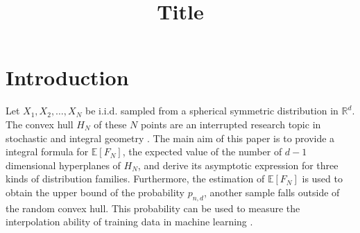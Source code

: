 \documentclass{aptpub}
\def\E{\mathbb{E}}
\begin{document}

\title{Title} %




\begin{abstract}
\end{abstract}

\keywords{}%

\ams{}{}%


\section{Introduction} %


Let $X_1, X_2, \dots, X_N$ be i.i.d. sampled from a spherical symmetric distribution in $\mathbb{R}^d$.
The convex hull $H_N$ of these $N$ points are an interrupted research topic in stochastic and integral geometry
\cite{schneider2008stochastic}.
The main aim of this paper is to provide a integral formula for $\E[F_N]$, the expected value of the number of $d-1$ dimensional hyperplanes
of $H_N$,
and derive its asymptotic expression
for three kinds of distribution families. Furthermore, the estimation of $\E[F_N]$ is used to obtain the upper bound
of the probability $p_{n,d}$, another sample falls outside of the random convex hull. This probability can be used to
measure the interpolation ability of training data in machine learning
\cite{balestriero2021learning}.
\end{document}
